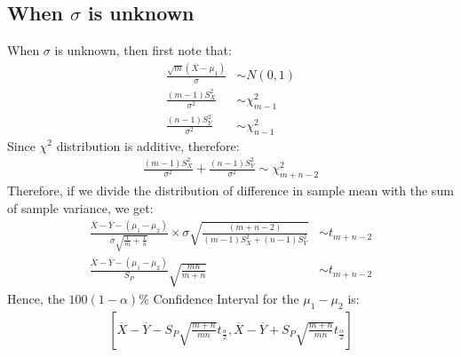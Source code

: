 \documentclass[a4paper]{article}
\begin{document}
\subsection{When $\sigma$ is unknown}
When $\sigma$ is unknown, then first note that:
\begin{equation*}
	\begin{split}
		\frac{\sqrt{m}\left( \overline{X} - \mu_1 \right)  }{\sigma} &\sim N\left( 0,1 \right)\\
		\frac{\left( m-1 \right) S_X^2}{\sigma^2} &\sim \chi^2_{m-1}\\
		\frac{\left( n-1 \right) S_Y^2}{\sigma^2} &\sim \chi^2_{n-1}
	\end{split}
\end{equation*}
Since $\chi^2$ distribution is additive, therefore:
\begin{equation*}
	\begin{split}
		\frac{\left( m-1 \right) S_X^2}{\sigma^2} + \frac{\left( n-1 \right) S_Y^2}{\sigma^2} \sim \chi^2_{m+n-2}
	\end{split}
\end{equation*}
Therefore, if we divide the distribution of difference in sample mean with the sum of sample variance, we get:
\begin{equation*}
	\begin{split}
		\frac{\overline{X} - \overline{Y} - \left( \mu_1-\mu_2 \right) }{\sigma\sqrt{\frac{1}{m}+\frac{1}{n}} } \times  \sigma \sqrt{  \frac{\left( m+n-2 \right) }{\left( m-1 \right) S_X^2 + \left( n-1 \right) S_Y^2} }    &\sim t_{m+n-2}\\
		\frac{\overline{X} - \overline{Y} - \left( \mu_1 - \mu_2 \right) }{S_P} \sqrt{\frac{mn}{m+n} } &\sim t_{m+n-2} 
	\end{split}
\end{equation*}
Hence, the $100\left( 1-\alpha \right) \%$ Confidence Interval for the $\mu_1-\mu_2$ is:
\begin{equation*}
	\begin{split}
		\left[ \overline{X} - \overline{Y} - S_P \sqrt{\frac{m+n}{mn}}t_\frac{\alpha}{2} , \overline{X} - \overline{Y} + S_P \sqrt{\frac{m+n}{mn}}t_\frac{\alpha}{2}   \right] 
	\end{split}
\end{equation*}
\newpage
\end{document}
